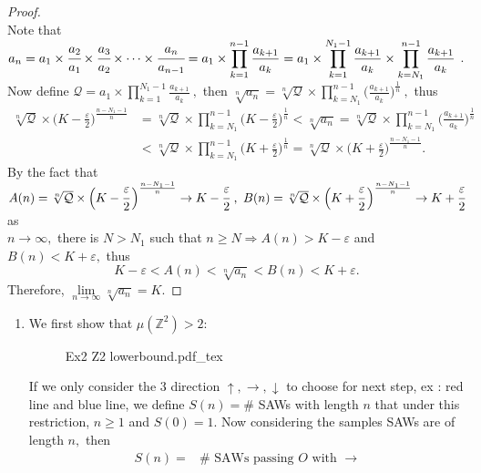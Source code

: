 \documentclass[12pt,a4paper]{report}
\theoremstyle{definition}
\newcommand{\incfig}[1]{%
{#1.pdf_tex}
}
\begin{document}
\begin{enumerate}
\begin{proof}
\[	\]
	Note that $a_n=a_1\times \cfrac{a_2}{a_1}\times \cfrac{a_3}{a_2}\times \cdots \times \cfrac{a_n}{a_{n-1}}=a_1\times{\displaystyle \prod_{k=1}^{n-1} \frac{a_{k+1}}{a_k}}=a_1\times{\displaystyle \prod_{k=1}^{N_1-1} \frac{a_{k+1}}{a_k}}\times{\displaystyle \prod_{k=N_1}^{n-1} \frac{a_{k+1}}{a_k}}$ . \\
	Now define $\mathcal{Q}=a_1\times{\displaystyle \prod_{k=1}^{N_1-1} \frac{a_{k+1}}{a_k}}\ ,$ then $\sqrt[n]{a_n}=\sqrt[n]{\mathcal{Q}}\times {\displaystyle \prod_{k=N_1}^{n-1} \Big(\frac{a_{k+1}}{a_k}\Big)^{\frac{1}{n}}}\ , $ thus
	\begin{align*}
	    	\sqrt[n]{\mathcal{Q}}\times\Big(K-\frac{\varepsilon}{2}\Big)^{\frac{n-N_1-1}{n}}&= \sqrt[n]{\mathcal{Q}}\times{\displaystyle \prod_{k=N_1}^{n-1}\Big(K-\frac{\varepsilon}{2}\Big)^{\frac{1}{n}}}<\sqrt[n]{a_n}=\sqrt[n]{\mathcal{Q}}\times {\displaystyle \prod_{k=N_1}^{n-1} \Big(\frac{a_{k+1}}{a_k}\Big)^{\frac{1}{n}}}\\
	    	&<\sqrt[n]{\mathcal{Q}}\times{\displaystyle \prod_{k=N_1}^{n-1}\Big(K+\frac{\varepsilon}{2}\Big)^{\frac{1}{n}}}=\sqrt[n]{\mathcal{Q}}\times\Big(K+\frac{\varepsilon}{2}\Big)^{\frac{n-N_1-1}{n}}.
	\end{align*}
	By the fact that \\
	$A(n)=\sqrt[n]{\mathcal{Q}}\times\Big(K-\cfrac{\varepsilon}{2}\,\Big)^{\frac{n-N_1-1}{n}}\to K-\cfrac{\varepsilon}{2}\ ,\ B(n)=\sqrt[n]{\mathcal{Q}}\times\Big(K+\cfrac{\varepsilon}{2}\,\Big)^{\frac{n-N_1-1}{n}}\to K+\cfrac{\varepsilon}{2} $ as\\[3pt] $n\to\infty,$ there is $N>N_1$ such that $n\geq N\Rightarrow A(n)>K-\varepsilon$ and $B(n)<K+\varepsilon,$ thus 
	\[
	K-\varepsilon<A(n)<\sqrt[n]{a_n}<B(n)<K+\varepsilon.
	\]
	Therefore, $\lim\limits_{n\to\infty}\sqrt[n]{a_n}=K.$
	\end{proof}
	\begin{enumerate}
		\item We first show that $\mu(\mathbb{Z}^2)>2:$
		\begin{figure}[htp]
		\centering
		\def\svgwidth{8cm}
		\incfig{Ex2 Z2 lowerbound}
		\end{figure}
		\newpage
		If we only consider the 3 direction $\uparrow,\rightarrow,\downarrow$ to choose for next step, ex : red line and blue line, we define $S(n)=\#$ SAWs with length $n$ that under this restriction, $n\geq 1$ and $S(0)=1.$ Now considering the samples SAWs are of length $n,$ then 
		\begin{align*}
	    	S(n)=&\#\mbox{ SAWs passing } O\mbox{ with } \rightarrow\\

\end{align*}
\end{enumerate}
\end{enumerate}
\end{document}
